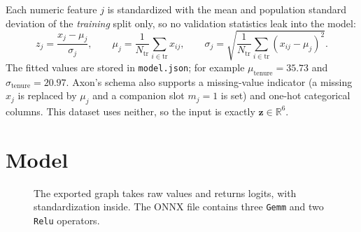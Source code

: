 \documentclass[11pt]{article}
\newcommand{\R}{\mathbb{R}}
\newcommand{\code}[1]{\texttt{#1}}
\begin{document}
Each numeric feature $j$ is standardized with the mean and population standard
deviation of the \emph{training} split only, so no validation statistics leak
into the model:
\begin{equation}
  z_j = \frac{x_j - \mu_j}{\sigma_j}, \qquad
  \mu_j = \frac{1}{N_{\text{tr}}}\sum_{i \in \text{tr}} x_{ij}, \qquad
  \sigma_j = \sqrt{\frac{1}{N_{\text{tr}}}\sum_{i \in \text{tr}} (x_{ij} - \mu_j)^2 }.
\end{equation}
The fitted values are stored in \code{model.json}; for example
$\mu_{\text{tenure}} = 35.73$ and $\sigma_{\text{tenure}} = 20.97$. Axon's schema
also supports a missing-value indicator (a missing $x_j$ is replaced by $\mu_j$
and a companion slot $m_j = 1$ is set) and one-hot categorical columns. This
dataset uses neither, so the input is exactly $\bm{z} \in \R^{6}$.

\section{Model}\label{sec:model}

\begin{figure}[htbp]
\centering
{}
\caption{The exported graph takes raw values and returns logits, with
standardization inside. The ONNX file contains three \code{Gemm} and two
\code{Relu} operators.}
\label{fig:arch}
\end{figure}
\end{document}
